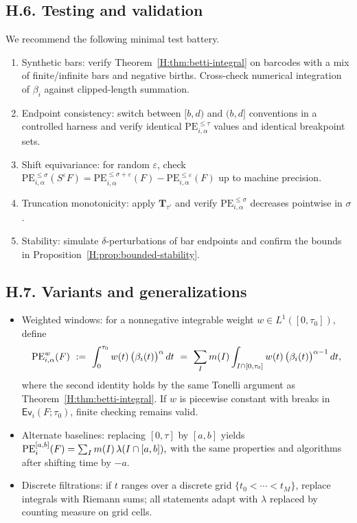 \documentclass[11pt]{article}
\numberwithin{equation}{section}
\theoremstyle{plain}
\theoremstyle{definition}
\theoremstyle{remark}
\theoremstyle{plain}
\theoremstyle{definition}
\numberwithin{equation}{section}
\theoremstyle{definition}
\numberwithin{equation}{section}
\theoremstyle{plain}
\theoremstyle{definition}
\theoremstyle{remark}
\providecommand{\n}{\unskip\space}
\begin{document}
\subsection*{H.6. Testing and validation}
We recommend the following minimal test battery.
\begin{enumerate}
  \item Synthetic bars: verify Theorem~\ref{H:thm:betti-integral} on barcodes with a mix of finite/infinite bars and negative births. Cross-check numerical integration of $\beta_i$ against clipped-length summation.
  \item Endpoint consistency: switch between $[b,d)$ and $(b,d]$ conventions in a controlled harness and verify identical $\mathrm{PE}_{i,\alpha}^{\le \tau}$ values and identical breakpoint sets.
  \item Shift equivariance: for random $\varepsilon$, check $\mathrm{PE}_{i,\alpha}^{\le \sigma}(S^\varepsilon F)=\mathrm{PE}_{i,\alpha}^{\le \sigma+\varepsilon}(F)-\mathrm{PE}_{i,\alpha}^{\le \varepsilon}(F)$ up to machine precision.
  \item Truncation monotonicity: apply $\mathbf{T}_{\tau'}$ and verify $\mathrm{PE}_{i,\alpha}^{\le \sigma}$ decreases pointwise in $\sigma$.
  \item Stability: simulate $\delta$-perturbations of bar endpoints and confirm the bounds in Proposition~\ref{H:prop:bounded-stability}.
\end{enumerate}

\subsection*{H.7. Variants and generalizations}
\begin{itemize}
  \item Weighted windows: for a nonnegative integrable weight $w\in L^1([0,\tau_0])$, define
  \[
  \mathrm{PE}_{i,\alpha}^{w}(F)\ :=\ \int_{0}^{\tau_0} w(t)\,\bigl(\beta_i(t)\bigr)^{\alpha}\,dt\n  \ =\ \sum_{I} m(I)\int_{I\cap[0,\tau_0]} w(t)\,\bigl(\beta_i(t)\bigr)^{\alpha-1}\,dt,
  \]
  where the second identity holds by the same Tonelli argument as Theorem~\ref{H:thm:betti-integral}. If $w$ is piecewise constant with breaks in $\mathsf{Ev}_i(F;\tau_0)$, finite checking remains valid.
  \item Alternate baselines: replacing $[0,\tau]$ by $[a,b]$ yields
  \(\n  \mathrm{PE}_i^{[a,b]}(F)=\sum_I m(I)\,\lambda(I\cap[a,b]),\n  \)
  with the same properties and algorithms after shifting time by $-a$.
  \item Discrete filtrations: if $t$ ranges over a discrete grid $\{t_0<\cdots<t_M\}$, replace integrals with Riemann sums; all statements adapt with $\lambda$ replaced by counting measure on grid cells.
\end{itemize}
\end{document}
